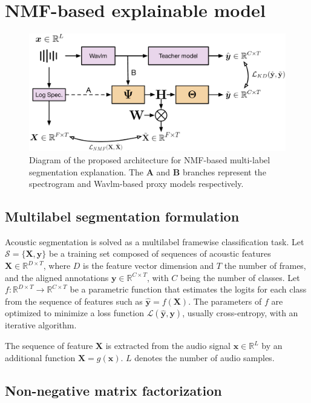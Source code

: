 \section{NMF-based explainable model}
\label{sect:models}
\begin{figure}[ht]
    \centering
    \includegraphics[width=\linewidth]{figs/nmf_model_icassp.pdf}
    \caption{Diagram of the proposed architecture for NMF-based multi-label segmentation explanation. The \textbf{A} and \textbf{B} branches represent the spectrogram and Wavlm-based proxy models respectively.}
    \label{fig:enter-label}
\end{figure}

\subsection{Multilabel segmentation formulation}

Acoustic segmentation is solved as a multilabel framewise classification task.
Let $\mathcal{S}=\{\mathbf{X}, \mathbf{y}\}$ be a training set composed of sequences of acoustic features $\mathbf{X}\in\mathbb{R}^{D\times T}$, where $D$ is the feature vector dimension and $T$ the number of frames, and the aligned annotations $\mathbf{y}\in \mathbb{R}^{C\times T}$, with $C$ being the number of classes. 
Let $f:\mathbb{R}^{D\times T} \rightarrow \mathbb{R}^{C\times T}$ be a parametric function that estimates the logits for each class from the sequence of features such as $\hat{\mathbf{y}}=f(\mathbf{X})$.
The parameters of $f$ are optimized to minimize a loss function $\mathcal{L}(\hat{\mathbf{y}},\mathbf{y})$, usually cross-entropy, with an iterative algorithm.

The sequence of feature $\mathbf{X}$ is extracted from the audio signal $\mathbf{x}\in\mathbb{R}^{L}$ by an additional function $\mathbf{X}=g(\mathbf{x})$. 
$L$ denotes the number of audio samples.

\subsection{Non-negative matrix factorization}

